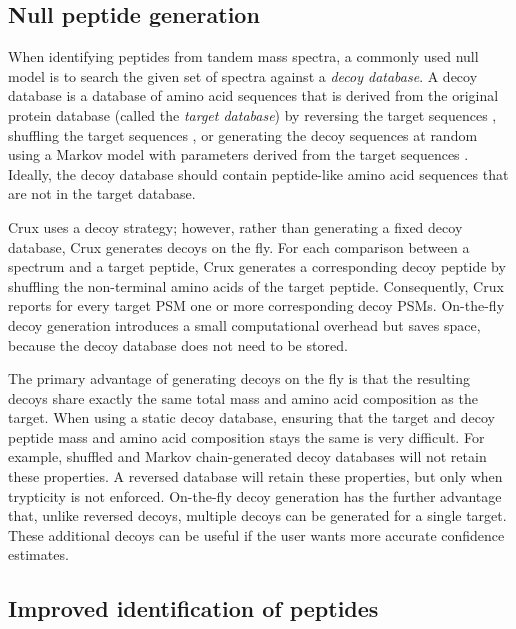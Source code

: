 \documentclass[12pt]{article}
\begin{document}
\subsection{Null peptide generation}
\label{section:on-the-fly}

When identifying peptides from tandem mass spectra, a commonly used
null model is to search the given set of spectra against a {\em decoy
database}.  A decoy database is a database of amino acid sequences
that is derived from the original protein database (called the {\em
target database}) by reversing the target sequences
\cite{moore:qscore}, shuffling the target sequences
\cite{klammer:effects}, or generating the decoy sequences at random
using a Markov model with parameters derived from the target sequences
\cite{colinge:olav}.  Ideally, the decoy database should contain
peptide-like amino acid sequences that are not in the target database.

Crux uses a decoy strategy; however, rather than generating a fixed
decoy database, Crux generates decoys on the fly.  For each comparison
between a spectrum and a target peptide, Crux generates a
corresponding decoy peptide by shuffling the non-terminal amino acids
of the target peptide.  Consequently, Crux reports for every target
PSM one or more corresponding decoy PSMs.  On-the-fly decoy generation
introduces a small computational overhead but saves space, because the
decoy database does not need to be stored.

The primary advantage of generating decoys on the fly is that the
resulting decoys share exactly the same total mass and amino acid
composition as the target.  When using a static decoy database,
ensuring that the target and decoy peptide mass and amino acid
composition stays the same is very difficult.  For example, shuffled
and Markov chain-generated decoy databases will not retain these
properties.  A reversed database will retain these properties, but
only when trypticity is not enforced.  On-the-fly decoy generation has
the further advantage that, unlike reversed decoys, multiple decoys
can be generated for a single target.  These additional decoys can be
useful if the user wants more accurate confidence estimates.

\subsection{Improved identification of peptides}
\end{document}
